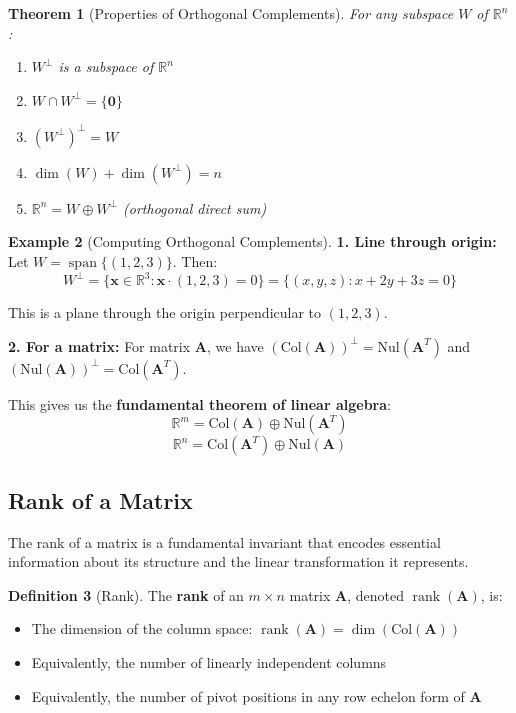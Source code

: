 \documentclass[12pt]{article}
\numberwithin{equation}{section}
\newcommand{\vect}[1]{\boldsymbol{#1}}   %
\newcommand{\mat}[1]{\mathbf{#1}}        %
\newcommand{\Span}{\operatorname{span}}
\newcommand{\rank}{\operatorname{rank}}
\theoremstyle{plain}
\newtheorem{theorem}{Theorem}[section]
\theoremstyle{definition}
\newtheorem{definition}[theorem]{Definition}
\newtheorem{example}[theorem]{Example}
\theoremstyle{remark}
\begin{document}
\begin{theorem}[Properties of Orthogonal Complements]
For any subspace $W$ of $\mathbb{R}^n$:
\begin{enumerate}
\item $W^{\perp}$ is a subspace of $\mathbb{R}^n$
\item $W \cap W^{\perp} = \{\vect{0}\}$
\item $(W^{\perp})^{\perp} = W$
\item $\dim(W) + \dim(W^{\perp}) = n$
\item $\mathbb{R}^n = W \oplus W^{\perp}$ (orthogonal direct sum)
\end{enumerate}
\end{theorem}

\begin{example}[Computing Orthogonal Complements]
\textbf{1. Line through origin:}
Let $W = \Span\{(1, 2, 3)\}$. Then:
$$W^{\perp} = \{\vect{x} \in \mathbb{R}^3 : \vect{x} \cdot (1, 2, 3) = 0\} = \{(x, y, z) : x + 2y + 3z = 0\}$$

This is a plane through the origin perpendicular to $(1, 2, 3)$.

\textbf{2. For a matrix:}
For matrix $\mat{A}$, we have $(\text{Col}(\mat{A}))^{\perp} = \text{Nul}(\mat{A}^T)$ and $(\text{Nul}(\mat{A}))^{\perp} = \text{Col}(\mat{A}^T)$.

This gives us the \textbf{fundamental theorem of linear algebra}:
$$\mathbb{R}^m = \text{Col}(\mat{A}) \oplus \text{Nul}(\mat{A}^T)$$
$$\mathbb{R}^n = \text{Col}(\mat{A}^T) \oplus \text{Nul}(\mat{A})$$
\end{example}

\subsection{Rank of a Matrix}

The rank of a matrix is a fundamental invariant that encodes essential information about its structure and the linear transformation it represents.

\begin{definition}[Rank]
The \textbf{rank} of an $m \times n$ matrix $\mat{A}$, denoted $\rank(\mat{A})$, is:
\begin{itemize}
\item The dimension of the column space: $\rank(\mat{A}) = \dim(\text{Col}(\mat{A}))$
\item Equivalently, the number of linearly independent columns
\item Equivalently, the number of pivot positions in any row echelon form of $\mat{A}$
\end{itemize}
\end{definition}
\end{document}
